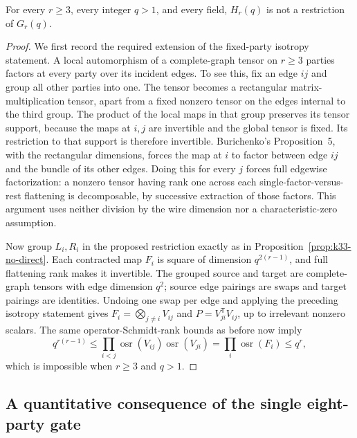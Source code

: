 \begin{proposition}
\label{prop:krr-no-direct}
For every $r\ge3$, every integer $q>1$, and every field,
$H_r(q)$ is not a restriction of $G_r(q)$.
\end{proposition}
\begin{proof}
We first record the required extension of the fixed-party isotropy
statement.  A local automorphism of a complete-graph tensor on
$r\ge3$ parties factors at every party over its incident edges.
To see this, fix an edge $ij$ and group all other parties into one.
The tensor becomes a rectangular matrix-multiplication tensor,
apart from a fixed nonzero tensor on the edges internal to the
third group.  The product of the local maps in that group
preserves its tensor support, because the maps at $i,j$ are
invertible and the global tensor is fixed.  Its restriction to
that support is therefore invertible.  Burichenko's
Proposition~5, with the rectangular dimensions, forces the map
at $i$ to factor between edge $ij$ and the bundle of its other
edges.  Doing this for every $j$ forces full edgewise
factorization: a nonzero tensor having rank one across each
single-factor-versus-rest flattening is decomposable, by
successive extraction of those factors.  This argument uses
neither division by the wire dimension nor a characteristic-zero
assumption.

Now group $L_i,R_i$ in the proposed restriction exactly as in
Proposition~\ref{prop:k33-no-direct}.  Each contracted map $F_i$
is square of dimension $q^{2(r-1)}$, and full flattening rank
makes it invertible.  The grouped source and target are
complete-graph tensors with edge dimension $q^2$; source edge
pairings are swaps and target pairings are identities.  Undoing
one swap per edge and applying the preceding isotropy statement
gives $F_i=\bigotimes_{j\ne i}V_{ij}$ and
$P=V_{ji}^{\mathsf T}V_{ij}$, up to irrelevant nonzero scalars.
The same operator-Schmidt-rank bounds as before now imply
\[
 q^{r(r-1)}
 \le\prod_{i<j}\operatorname{osr}(V_{ij})
                     \operatorname{osr}(V_{ji})
 =\prod_i\operatorname{osr}(F_i)\le q^r,
\]
which is impossible when $r\ge3$ and $q>1$.
\end{proof}

\subsection{A quantitative consequence of the single eight-party gate}

